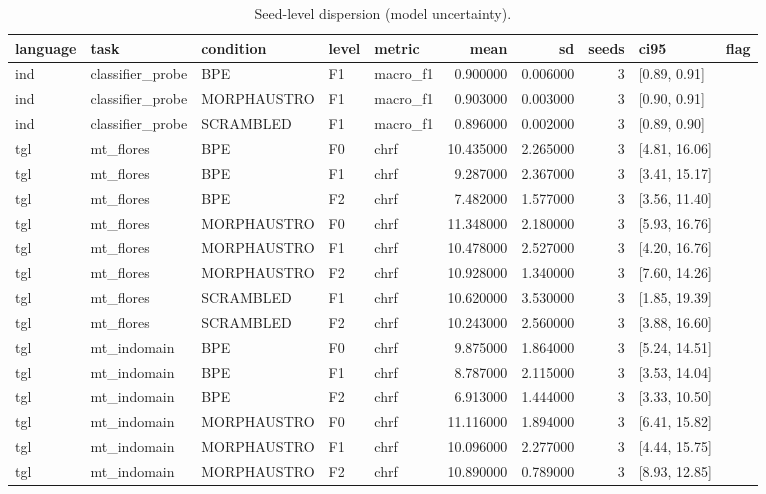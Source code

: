 
\begin{table}
\caption{Seed-level dispersion (model uncertainty).}
\label{tab:dispersion}
\begin{tabular}{lllllrrrll}
\toprule
language & task & condition & level & metric & mean & sd & seeds & ci95 & flag \\
\midrule
ind & classifier\_probe & BPE & F1 & macro\_f1 & 0.900000 & 0.006000 & 3 & [0.89, 0.91] &  \\
ind & classifier\_probe & MORPHAUSTRO & F1 & macro\_f1 & 0.903000 & 0.003000 & 3 & [0.90, 0.91] &  \\
ind & classifier\_probe & SCRAMBLED & F1 & macro\_f1 & 0.896000 & 0.002000 & 3 & [0.89, 0.90] &  \\
tgl & mt\_flores & BPE & F0 & chrf & 10.435000 & 2.265000 & 3 & [4.81, 16.06] &  \\
tgl & mt\_flores & BPE & F1 & chrf & 9.287000 & 2.367000 & 3 & [3.41, 15.17] &  \\
tgl & mt\_flores & BPE & F2 & chrf & 7.482000 & 1.577000 & 3 & [3.56, 11.40] &  \\
tgl & mt\_flores & MORPHAUSTRO & F0 & chrf & 11.348000 & 2.180000 & 3 & [5.93, 16.76] &  \\
tgl & mt\_flores & MORPHAUSTRO & F1 & chrf & 10.478000 & 2.527000 & 3 & [4.20, 16.76] &  \\
tgl & mt\_flores & MORPHAUSTRO & F2 & chrf & 10.928000 & 1.340000 & 3 & [7.60, 14.26] &  \\
tgl & mt\_flores & SCRAMBLED & F1 & chrf & 10.620000 & 3.530000 & 3 & [1.85, 19.39] &  \\
tgl & mt\_flores & SCRAMBLED & F2 & chrf & 10.243000 & 2.560000 & 3 & [3.88, 16.60] &  \\
tgl & mt\_indomain & BPE & F0 & chrf & 9.875000 & 1.864000 & 3 & [5.24, 14.51] &  \\
tgl & mt\_indomain & BPE & F1 & chrf & 8.787000 & 2.115000 & 3 & [3.53, 14.04] &  \\
tgl & mt\_indomain & BPE & F2 & chrf & 6.913000 & 1.444000 & 3 & [3.33, 10.50] &  \\
tgl & mt\_indomain & MORPHAUSTRO & F0 & chrf & 11.116000 & 1.894000 & 3 & [6.41, 15.82] &  \\
tgl & mt\_indomain & MORPHAUSTRO & F1 & chrf & 10.096000 & 2.277000 & 3 & [4.44, 15.75] &  \\
tgl & mt\_indomain & MORPHAUSTRO & F2 & chrf & 10.890000 & 0.789000 & 3 & [8.93, 12.85] &  \\

\end{tabular}
\end{table}
